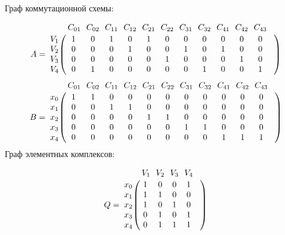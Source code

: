 \documentclass{article}
\begin{document}
Граф коммутационной схемы:

\begin{figure}[h]
\end{figure}
$$
 A =
\bordermatrix{ & C_{01} \!&\! C_{02} \!&\! C_{11} \!&\! C_{12} \!&\! C_{21} \!&\! C_{22} \!&\! C_{31} \!&\! C_{32} \!&\! C_{41} \!&\! C_{42} \!&\! C_{43} \!&\! \cr 
V_{1} \!&\! 1 \!&\! 0 \!&\! 1 \!&\! 0 \!&\! 1 \!&\! 0 \!&\! 0 \!&\! 0 \!&\! 0 \!&\! 0 \!&\! 0 \!&\! \cr
V_{2} \!&\! 0 \!&\! 0 \!&\! 0 \!&\! 1 \!&\! 0 \!&\! 0 \!&\! 1 \!&\! 0 \!&\! 1 \!&\! 0 \!&\! 0 \!&\! \cr
V_{3} \!&\! 0 \!&\! 0 \!&\! 0 \!&\! 0 \!&\! 0 \!&\! 1 \!&\! 0 \!&\! 0 \!&\! 0 \!&\! 1 \!&\! 0 \!&\! \cr
V_{4} \!&\! 0 \!&\! 1 \!&\! 0 \!&\! 0 \!&\! 0 \!&\! 0 \!&\! 0 \!&\! 1 \!&\! 0 \!&\! 0 \!&\! 1 \!&\! \cr
}$$
$$
B =
\bordermatrix{ & C_{01} \!&\! C_{02} \!&\! C_{11} \!&\! C_{12} \!&\! C_{21} \!&\! C_{22} \!&\! C_{31} \!&\! C_{32} \!&\! C_{41} \!&\! C_{42} \!&\! C_{43} \!&\! \cr 
x_{0} \!&\! 1 \!&\! 1 \!&\! 0 \!&\! 0 \!&\! 0 \!&\! 0 \!&\! 0 \!&\! 0 \!&\! 0 \!&\! 0 \!&\! 0 \!&\! \cr
x_{1} \!&\! 0 \!&\! 0 \!&\! 1 \!&\! 1 \!&\! 0 \!&\! 0 \!&\! 0 \!&\! 0 \!&\! 0 \!&\! 0 \!&\! 0 \!&\! \cr
x_{2} \!&\! 0 \!&\! 0 \!&\! 0 \!&\! 0 \!&\! 1 \!&\! 1 \!&\! 0 \!&\! 0 \!&\! 0 \!&\! 0 \!&\! 0 \!&\! \cr
x_{3} \!&\! 0 \!&\! 0 \!&\! 0 \!&\! 0 \!&\! 0 \!&\! 0 \!&\! 1 \!&\! 1 \!&\! 0 \!&\! 0 \!&\! 0 \!&\! \cr
x_{4} \!&\! 0 \!&\! 0 \!&\! 0 \!&\! 0 \!&\! 0 \!&\! 0 \!&\! 0 \!&\! 0 \!&\! 1 \!&\! 1 \!&\! 1 \!&\! \cr
}$$
Граф элементных комплексов:
\begin{figure}[h]
\end{figure}
$$
Q =
\bordermatrix{ & V_{1} \!&\! V_{2} \!&\! V_{3} \!&\! V_{4} \!&\! \cr 
x_{0} \!&\! 1 \!&\! 0 \!&\! 0 \!&\! 1 \!&\! \cr
x_{1} \!&\! 1 \!&\! 1 \!&\! 0 \!&\! 0 \!&\! \cr
x_{2} \!&\! 1 \!&\! 0 \!&\! 1 \!&\! 0 \!&\! \cr
x_{3} \!&\! 0 \!&\! 1 \!&\! 0 \!&\! 1 \!&\! \cr
x_{4} \!&\! 0 \!&\! 1 \!&\! 1 \!&\! 1 \!&\! \cr
}$$
\end{document}

